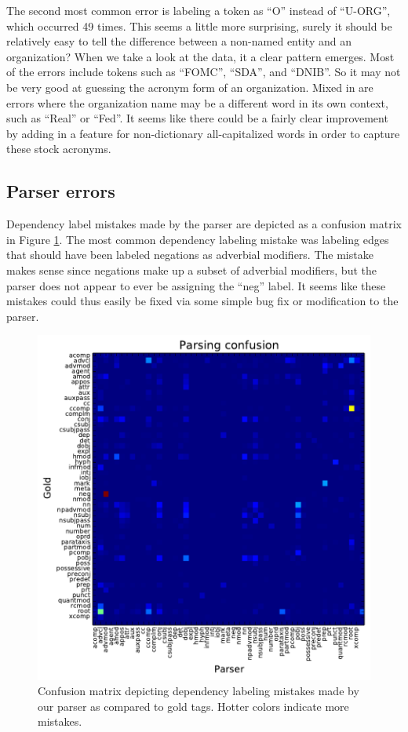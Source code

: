 \documentclass[12pt]{article}
\begin{document}
The second most common error is labeling a token as ``O'' instead of ``U-ORG'', which occurred 49 times. This seems a little more surprising, surely it should be relatively easy to tell the difference between a non-named entity and an organization? When we take a look at the data, it a clear pattern emerges. Most of the errors include tokens such as ``FOMC'', ``SDA'', and ``DNIB''. So it may not be very good at guessing the acronym form of an organization. Mixed in are errors where the organization name may be a different word in its own context, such as ``Real'' or ``Fed''. It seems like there could be a fairly clear improvement by adding in a feature for non-dictionary all-capitalized words in order to capture these stock acronyms.

\subsection{Parser errors}
Dependency label mistakes made by the parser are depicted as a confusion matrix in Figure \ref{parseconfusion}. The most common dependency labeling mistake was labeling edges that should have been labeled negations as adverbial modifiers. The mistake makes sense since negations make up a subset of adverbial modifiers, but the parser does not appear to ever be assigning the ``neg'' label. It seems like these mistakes could thus easily be fixed via some simple bug fix or modification to the parser. 
\begin{figure}[!ht]
\begin{center}
\includegraphics[scale=1.0]{parse_output.pdf}
\caption{Confusion matrix depicting dependency labeling mistakes made by our parser as compared to gold tags. Hotter colors indicate more mistakes. \label{parseconfusion}}
\end{center}
\end{figure}
\end{document}
